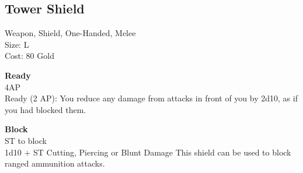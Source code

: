 \subsection{Tower Shield}\label{weapon:towerShield}
Weapon, Shield, One-Handed, Melee\\
Size: L\\
Cost: 80 Gold

\textbf{Ready}\\
4AP\\
Ready (2 AP): You reduce any damage from attacks in front of you by 2d10, as if you had blocked them.

\textbf{Block}\\
ST to block\\
1d10 + \texttimes ST Cutting, Piercing or Blunt Damage
This shield can be used to block ranged ammunition attacks.\\